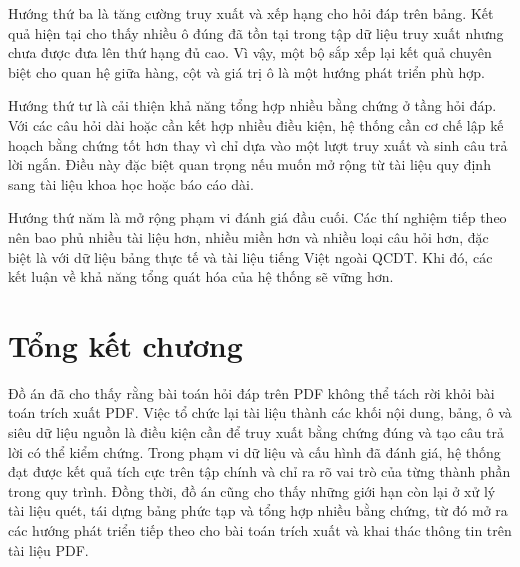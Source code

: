 \documentclass[../DoAn.tex]{subfiles}
\begin{document}
Hướng thứ ba là tăng cường truy xuất và xếp hạng cho hỏi đáp trên bảng. Kết quả hiện tại cho
thấy nhiều ô đúng đã tồn tại trong tập dữ liệu truy xuất nhưng chưa được đưa lên thứ hạng đủ cao.
Vì vậy, một bộ sắp xếp lại kết quả chuyên biệt cho quan hệ giữa hàng, cột và giá trị ô là một
hướng phát triển phù hợp.

Hướng thứ tư là cải thiện khả năng tổng hợp nhiều bằng chứng ở tầng hỏi đáp. Với
các câu hỏi dài hoặc cần kết hợp nhiều điều kiện, hệ thống cần cơ chế lập kế hoạch
bằng chứng tốt hơn thay vì chỉ dựa vào một lượt truy xuất và sinh câu trả lời ngắn.
Điều này đặc biệt quan trọng nếu muốn mở rộng từ tài liệu quy định sang tài liệu
khoa học hoặc báo cáo dài.

Hướng thứ năm là mở rộng phạm vi đánh giá đầu cuối. Các thí nghiệm tiếp theo nên
bao phủ nhiều tài liệu hơn, nhiều miền hơn và nhiều loại câu hỏi hơn, đặc biệt là
với dữ liệu bảng thực tế và tài liệu tiếng Việt ngoài QCDT. Khi đó, các kết luận về
khả năng tổng quát hóa của hệ thống sẽ vững hơn.

\section{Tổng kết chương}
\label{section:chapter7-summary}

Đồ án đã cho thấy rằng bài toán hỏi đáp trên PDF không thể tách rời khỏi bài toán
trích xuất PDF. Việc tổ chức lại tài liệu thành các khối nội dung, bảng, ô và siêu dữ liệu nguồn
là điều kiện cần để truy xuất bằng chứng đúng và tạo câu trả lời có thể kiểm chứng.
Trong phạm vi dữ liệu và cấu hình đã đánh giá, hệ thống đạt được kết quả tích cực
trên tập chính và chỉ ra rõ vai trò của từng thành phần trong quy trình. Đồng thời,
đồ án cũng cho thấy những giới hạn còn lại ở xử lý tài liệu quét, tái dựng bảng phức tạp và
tổng hợp nhiều bằng chứng, từ đó mở ra các hướng phát triển tiếp theo cho bài toán
trích xuất và khai thác thông tin trên tài liệu PDF.
\end{document}
